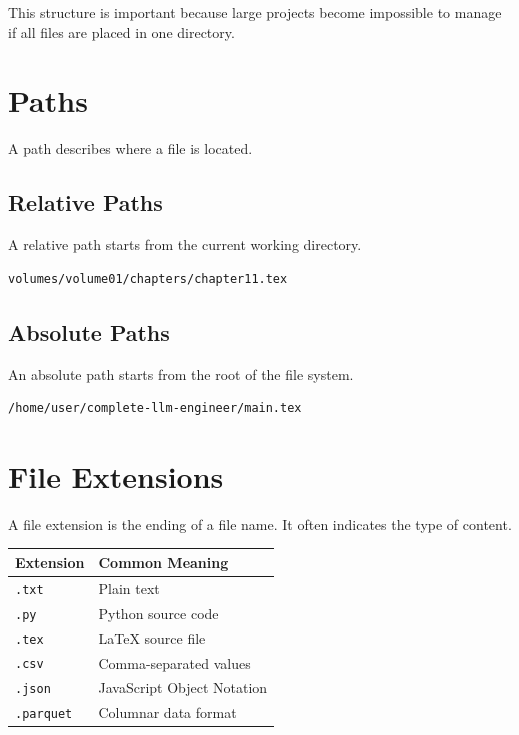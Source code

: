 This structure is important because large projects become impossible to manage if all files are placed in one directory.

\section{Paths}

A path describes where a file is located.

\subsection{Relative Paths}

A relative path starts from the current working directory.

\begin{lstlisting}[language=bash]
volumes/volume01/chapters/chapter11.tex
\end{lstlisting}

\subsection{Absolute Paths}

An absolute path starts from the root of the file system.

\begin{lstlisting}[language=bash]
/home/user/complete-llm-engineer/main.tex
\end{lstlisting}

\section{File Extensions}

A file extension is the ending of a file name. It often indicates the type of content.

\begin{center}
\begin{tabular}{ll}
\toprule
Extension & Common Meaning \\
\midrule
\texttt{.txt} & Plain text \\
\texttt{.py} & Python source code \\
\texttt{.tex} & LaTeX source file \\
\texttt{.csv} & Comma-separated values \\
\texttt{.json} & JavaScript Object Notation \\
\texttt{.parquet} & Columnar data format \\
\bottomrule
\end{tabular}
\end{center}

